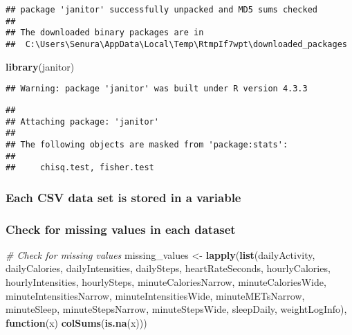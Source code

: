 \documentclass[
]{article}
\newenvironment{Shaded}{\begin{snugshade}}{\end{snugshade}}
\newcommand{\CommentTok}[1]{\textcolor[rgb]{0.56,0.35,0.01}{\textit{#1}}}
\newcommand{\ControlFlowTok}[1]{\textcolor[rgb]{0.13,0.29,0.53}{\textbf{#1}}}
\newcommand{\FunctionTok}[1]{\textcolor[rgb]{0.13,0.29,0.53}{\textbf{#1}}}
\newcommand{\NormalTok}[1]{#1}
\newcommand{\OtherTok}[1]{\textcolor[rgb]{0.56,0.35,0.01}{#1}}
\begin{document}
\begin{verbatim}
## package 'janitor' successfully unpacked and MD5 sums checked
## 
## The downloaded binary packages are in
##  C:\Users\Senura\AppData\Local\Temp\RtmpIf7wpt\downloaded_packages
\end{verbatim}

\begin{Shaded}
\begin{Highlighting}[]
\FunctionTok{library}\NormalTok{(janitor)}
\end{Highlighting}
\end{Shaded}

\begin{verbatim}
## Warning: package 'janitor' was built under R version 4.3.3
\end{verbatim}

\begin{verbatim}
## 
## Attaching package: 'janitor'
## 
## The following objects are masked from 'package:stats':
## 
##     chisq.test, fisher.test
\end{verbatim}

\hypertarget{each-csv-data-set-is-stored-in-a-variable}{%
\subsubsection{Each CSV data set is stored in a
variable}\label{each-csv-data-set-is-stored-in-a-variable}}

\hypertarget{check-for-missing-values-in-each-dataset}{%
\subsubsection{Check for missing values in each
dataset}\label{check-for-missing-values-in-each-dataset}}

\begin{Shaded}
\begin{Highlighting}[]
\CommentTok{\# Check for missing values}
\NormalTok{missing\_values }\OtherTok{\textless{}{-}} \FunctionTok{lapply}\NormalTok{(}\FunctionTok{list}\NormalTok{(dailyActivity, dailyCalories, dailyIntensities, dailySteps,}
\NormalTok{                               heartRateSeconds, hourlyCalories, hourlyIntensities,}
\NormalTok{                               hourlySteps, minuteCaloriesNarrow, minuteCaloriesWide,}
\NormalTok{                               minuteIntensitiesNarrow, minuteIntensitiesWide,}
\NormalTok{                               minuteMETsNarrow, minuteSleep, minuteStepsNarrow,}
\NormalTok{                               minuteStepsWide, sleepDaily, weightLogInfo), }
                         \ControlFlowTok{function}\NormalTok{(x) }\FunctionTok{colSums}\NormalTok{(}\FunctionTok{is.na}\NormalTok{(x)))}
\end{Highlighting}
\end{Shaded}
\end{document}
